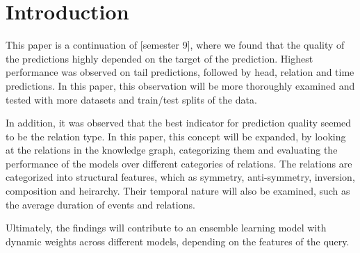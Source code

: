 \section{Introduction}
\label{sec:introduction}



This paper is a continuation of [semester 9], where we found that the quality of the predictions highly depended on the target of the prediction. Highest performance was observed on tail predictions, followed by head, relation and time predictions. In this paper, this observation will be more thoroughly examined and tested with more datasets and train/test splits of the data.

In addition, it was observed that the best indicator for prediction quality seemed to be the relation type. In this paper, this concept will be expanded, by looking at the relations in the knowledge graph, categorizing them and evaluating the performance of the models over different categories of relations. The relations are categorized into structural features, which as symmetry, anti-symmetry, inversion, composition and heirarchy. Their temporal nature will also be examined, such as the average duration of events and relations.

Ultimately, the findings will contribute to an ensemble learning model with dynamic weights across different models, depending on the features of the query.
